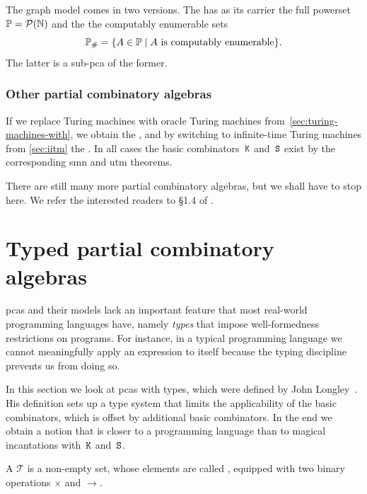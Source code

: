 The graph model comes in two versions. The  has as its carrier the full powerset $\mathbb{P} = \mathcal{P}(\mathbb{N})$ and the  the computably enumerable sets
%
\begin{equation*}
  \mathbb{P}_{\#} = \{ A \in \mathbb{P} \mid \text{$A$ is computably enumerable} \}.
\end{equation*}
%
The latter is a sub-pca of the former.

\subsubsection{Other partial combinatory algebras}
\label{sec:other-pcas}

If we replace Turing machines with oracle Turing machines from~\cref{sec:turing-machines-with}, we obtain the , and by switching to infinite-time Turing machines from \cref{sec:iitm} the . In all cases the basic combinators~$\mathtt{K}$ and~$\mathtt{S}$ exist by the corresponding smn and utm theorems.

There are still many more partial combinatory algebras, but we shall have to stop here. We refer the interested readers to \S1.4 of .




\section{Typed partial combinatory algebras}
\label{sec:tpcas}

pcas and their models lack an important feature that most
real-world programming languages have, namely \emph{types} that impose
well-formedness restrictions on programs. For instance, in a typical programming language we cannot meaningfully apply an  expression to itself because the typing discipline prevents us from doing so.

In this section we look at pcas with types, which were defined by John
Longley~.
His definition sets up a type system that limits the applicability of the basic combinators, which is offset by additional basic combinators. In the end we obtain a notion that is closer to a programming language than to magical incantations with~$\mathtt{K}$ and~$\mathtt{S}$.

\begin{definition}
  A  $\mathcal{T}$ is a non-empty set, whose elements
  are called , equipped with two binary operations $\times$
  and $\to$.
\end{definition}


